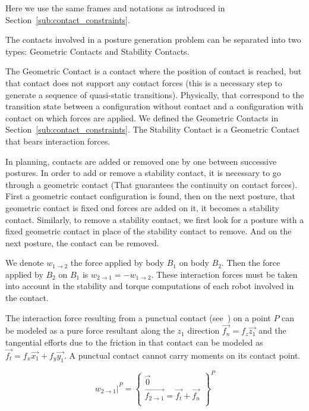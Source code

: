 Here we use the same frames and notations as introduced in Section~\ref{sub:contact_constraints}.

The contacts involved in a posture generation problem can be separated into two types: Geometric Contacts and Stability Contacts.

The Geometric Contact is a contact where the position of contact is reached, but that contact does not support any contact forces (this is a necessary step to generate a sequence of quasi-static transitions).
Physically, that correspond to the transition state between a configuration without contact and a configuration with contact on which forces are applied.
We defined the Geometric Contacts in Section~\ref{sub:contact_constraints}.
The Stability Contact is a Geometric Contact that bears interaction forces.

In planning, contacts are added or removed one by one between successive postures.
In order to add or remove a stability contact, it is necessary to go through a geometric contact (That guarantees the continuity on contact forces).
First a geometric contact configuration is found, then on the next posture, that geometric contact is fixed ond forces are added on it, it becomes a stability contact.
Similarly, to remove a stability contact, we first look for a posture with a fixed geometric contact in place of the stability contact to remove.
And on the next posture, the contact can be removed.

We denote $w_{1\rightarrow 2}$ the force applied by body $B_1$ on body $B_2$. Then the force applied by $B_2$ on $B_1$ is $w_{2\rightarrow 1} = -w_{1\rightarrow 2}$.
These interaction forces must be taken into account in the stability and torque computations of each robot involved in the contact.

The interaction force resulting from a punctual contact (see~) on a point $P$ can be modeled as a pure force resultant along the $z_1$ direction $\vec{f_n} = f_z \vec{z_1}$ and the tangential efforts due to the friction in that contact can be modeled as $\vec{f_t} = f_x \vec{x_1} + f_y \vec{y_1}$. A punctual contact cannot carry moments on its contact point.

\begin{equation}
\label{eq:punctual_force}
\left. w_{2\rightarrow 1}\right|^P = \left\{
  \begin{array}{l}
    \vec{0} \\
    \overrightarrow{f_{2\rightarrow 1}} = \vec{f_t} + \vec{f_n} \\
  \end{array}
  \right\}^P
\end{equation}

